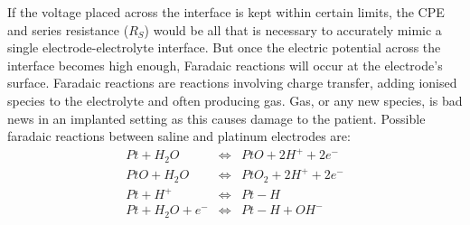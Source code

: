     If the voltage placed across the interface is kept within certain limits, the CPE and series resistance ($R_{S}$) would be all that is necessary to accurately mimic a single electrode-electrolyte interface.
    But once the electric potential across the interface becomes high enough, Faradaic reactions will occur at the electrode's surface.
    Faradaic reactions are reactions involving charge transfer, adding ionised species to the electrolyte and often producing gas.
    Gas, or any new species, is bad news in an implanted setting as this causes damage to the patient.
    Possible faradaic reactions between saline and platinum electrodes are:
    \begin{eqnarray}
        Pt + H_{2}O &\Leftrightarrow& PtO + 2 H^{+} + 2 e^{-}\\
        PtO + H_{2}O &\Leftrightarrow& PtO_{2} + 2 H^{+} + 2e^{-}\\
        Pt + H^{+} & \Leftrightarrow & Pt-H\\
        Pt + H_{2}O + e^{-} &\Leftrightarrow& Pt-H+OH^{-}
    \end{eqnarray}

